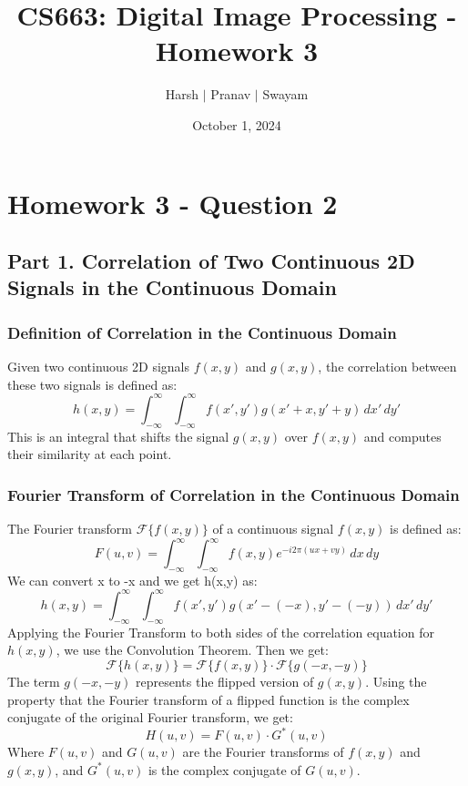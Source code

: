 \documentclass{article}
\title{CS663: Digital Image Processing - Homework 3}
\author{Harsh $\vert$ Pranav $\vert$ Swayam}
\date{October 1, 2024}
\begin{document}
\maketitle
\section{Homework 3 - Question 2}

\subsection*{Part 1. Correlation of Two Continuous 2D Signals in the Continuous Domain}

\subsubsection*{Definition of Correlation in the Continuous Domain}
Given two continuous 2D signals $f(x, y)$ and $g(x, y)$, the correlation between these two signals is defined as:
\[
h(x, y) = \int_{-\infty}^{\infty} \int_{-\infty}^{\infty} f(x', y') g(x' + x, y' + y) \, dx' \, dy'
\]
This is an integral that shifts the signal $g(x, y)$ over $f(x, y)$ and computes their similarity at each point.

\subsubsection*{Fourier Transform of Correlation in the Continuous Domain}
The Fourier transform $\mathcal{F}\{ f(x, y) \}$ of a continuous signal $f(x, y)$ is defined as:
\[
F(u, v) = \int_{-\infty}^{\infty} \int_{-\infty}^{\infty} f(x, y) e^{-i 2\pi (ux + vy)} \, dx \, dy
\]
We can convert x to -x and we get h(x,y) as:
\[
h(x, y) = \int_{-\infty}^{\infty} \int_{-\infty}^{\infty} f(x', y') g(x' - (-x), y' - (-y)) \, dx' \, dy'
\]
Applying the Fourier Transform to both sides of the correlation equation for $h(x, y)$, we use the Convolution Theorem. Then we get:
\[
\mathcal{F}\{h(x, y)\} = \mathcal{F}\{f(x, y)\} \cdot \mathcal{F}\{g(-x, -y)\}
\]
The term $g(-x, -y)$ represents the flipped version of $g(x, y)$. Using the property that the Fourier transform of a flipped function is the complex conjugate of the original Fourier transform, we get:
\[
H(u, v) = F(u, v) \cdot G^*(u, v)
\]
Where $F(u, v)$ and $G(u, v)$ are the Fourier transforms of $f(x, y)$ and $g(x, y)$, and $G^*(u, v)$ is the complex conjugate of $G(u, v)$.
\end{document}
